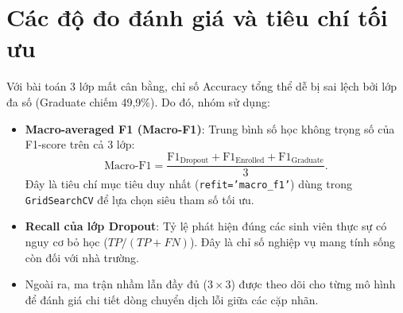 \section{Các độ đo đánh giá và tiêu chí tối ưu}
Với bài toán 3 lớp mất cân bằng, chỉ số Accuracy tổng thể dễ bị sai lệch bởi lớp đa số (Graduate chiếm 49,9\%). Do đó, nhóm sử dụng:
\begin{itemize}
    \item \textbf{Macro-averaged F1 (Macro-F1)}: Trung bình số học không trọng số của F1-score trên cả 3 lớp:
    \[
      \text{Macro-F1} = \frac{\text{F1}_{\text{Dropout}} + \text{F1}_{\text{Enrolled}} + \text{F1}_{\text{Graduate}}}{3}.
    \]
    Đây là tiêu chí mục tiêu duy nhất (\texttt{refit='macro\_f1'}) dùng trong \texttt{GridSearchCV} để lựa chọn siêu tham số tối ưu.
    \item \textbf{Recall của lớp Dropout}: Tỷ lệ phát hiện đúng các sinh viên thực sự có nguy cơ bỏ học ($TP / (TP + FN)$). Đây là chỉ số nghiệp vụ mang tính sống còn đối với nhà trường.
    \item Ngoài ra, ma trận nhầm lẫn đầy đủ ($3 \times 3$) được theo dõi cho từng mô hình để đánh giá chi tiết dòng chuyển dịch lỗi giữa các cặp nhãn.
\end{itemize}
